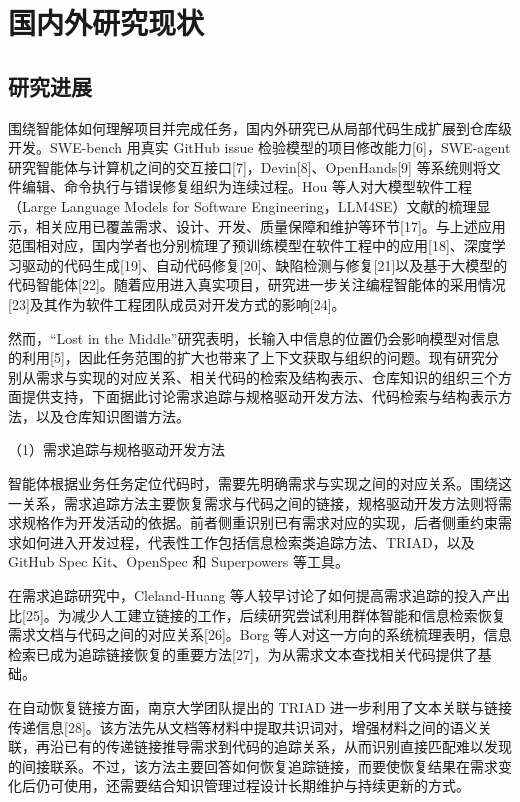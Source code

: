 \section{国内外研究现状}

\subsection{研究进展}
围绕智能体如何理解项目并完成任务，国内外研究已从局部代码生成扩展到仓库级开发。SWE-bench 用真实 GitHub issue 检验模型的项目修改能力[6]，SWE-agent 研究智能体与计算机之间的交互接口[7]，Devin[8]、OpenHands[9] 等系统则将文件编辑、命令执行与错误修复组织为连续过程。Hou 等人对大模型软件工程（Large Language Models for Software Engineering，LLM4SE）文献的梳理显示，相关应用已覆盖需求、设计、开发、质量保障和维护等环节[17]。与上述应用范围相对应，国内学者也分别梳理了预训练模型在软件工程中的应用[18]、深度学习驱动的代码生成[19]、自动代码修复[20]、缺陷检测与修复[21]以及基于大模型的代码智能体[22]。随着应用进入真实项目，研究进一步关注编程智能体的采用情况[23]及其作为软件工程团队成员对开发方式的影响[24]。

然而，“Lost in the Middle”研究表明，长输入中信息的位置仍会影响模型对信息的利用[5]，因此任务范围的扩大也带来了上下文获取与组织的问题。现有研究分别从需求与实现的对应关系、相关代码的检索及结构表示、仓库知识的组织三个方面提供支持，下面据此讨论需求追踪与规格驱动开发方法、代码检索与结构表示方法，以及仓库知识图谱方法。

（1）需求追踪与规格驱动开发方法

智能体根据业务任务定位代码时，需要先明确需求与实现之间的对应关系。围绕这一关系，需求追踪方法主要恢复需求与代码之间的链接，规格驱动开发方法则将需求规格作为开发活动的依据。前者侧重识别已有需求对应的实现，后者侧重约束需求如何进入开发过程，代表性工作包括信息检索类追踪方法、TRIAD，以及 GitHub Spec Kit、OpenSpec 和 Superpowers 等工具。

在需求追踪研究中，Cleland-Huang 等人较早讨论了如何提高需求追踪的投入产出比[25]。为减少人工建立链接的工作，后续研究尝试利用群体智能和信息检索恢复需求文档与代码之间的对应关系[26]。Borg 等人对这一方向的系统梳理表明，信息检索已成为追踪链接恢复的重要方法[27]，为从需求文本查找相关代码提供了基础。

在自动恢复链接方面，南京大学团队提出的 TRIAD 进一步利用了文本关联与链接传递信息[28]。该方法先从文档等材料中提取共识词对，增强材料之间的语义关联，再沿已有的传递链接推导需求到代码的追踪关系，从而识别直接匹配难以发现的间接联系。不过，该方法主要回答如何恢复追踪链接，而要使恢复结果在需求变化后仍可使用，还需要结合知识管理过程设计长期维护与持续更新的方式。

